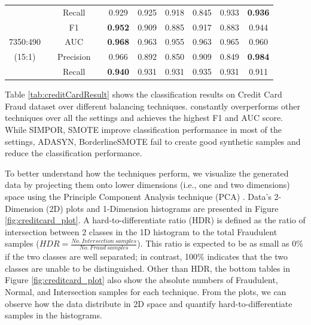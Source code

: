 \begin{table}[ht]
\begin{tabular}{rrcrcccccc}
			&       & Recall &       & 0.929 & 0.925 & 0.918 & 0.845 & 0.933 & \textbf{0.936} \\
			\cmidrule{1-1}\cmidrule{3-3}\cmidrule{5-10}          &       & F1    &       & \textbf{0.952} & 0.909 & 0.885 & 0.917 & 0.883 & 0.944 \\
			\multicolumn{1}{c}{7350:490 } &       & AUC   &       & \textbf{0.968} & 0.963 & 0.955 & 0.963 & 0.965 & 0.960 \\
			\multicolumn{1}{c}{(15:1)} &       & Precision &       & 0.966 & 0.892 & 0.850  & 0.909 & 0.849 & \textbf{0.984} \\
			&       & Recall &       & \textbf{0.940} & 0.931 & 0.931 & 0.935 & 0.931 & 0.911 \\
			\bottomrule
		\end{tabular}%
	

\end{table}%


Table \ref{tab:creditCardResult} shows the classification results on Credit Card Fraud dataset over different balancing techniques. \Methodname{} constantly overperforms other techniques over all the settings and achieves the highest F1 and AUC score. While SIMPOR, SMOTE improve classification performance in most of the settings, ADASYN, BorderlineSMOTE fail to create good synthetic samples and reduce the classification performance.       

To better understand how the techniques perform, we visualize the generated data by projecting them onto lower dimensions (i.e., one and two dimensions) space using the Principle Component Analysis technique (PCA) \cite{pca}. Data's 2-Dimension (2D) plots and 1-Dimension histograms are presented in Figure \ref{fig:creditcard_plot}. A hard-to-differentiate ratio (HDR) is defined as the ratio of intersection between 2 classes in the 1D histogram to the total Fraudulent samples ($HDR = \frac{No.\: Intersection \: samples}{No. \: Fraud \: samples} $). This ratio is expected to be as small as 0\% if the two classes are well separated; in contrast, 100\% indicates that the two classes are unable to be distinguished. Other than HDR, the bottom tables in Figure \ref{fig:creditcard_plot} also show the absolute numbers of Fraudulent, Normal, and Intersection samples for each technique. From the plots, we can observe how the data distribute in 2D space and quantify hard-to-differentiate samples in the histograms. 

